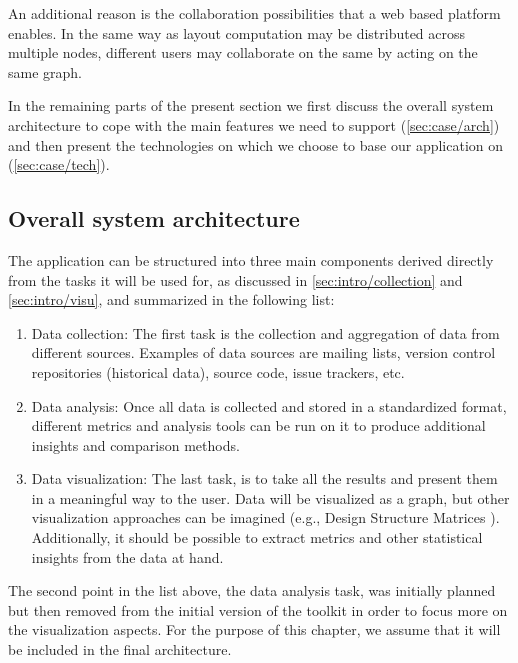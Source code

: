 An additional reason is the collaboration possibilities that a web based platform enables. In the same way as layout computation may be distributed across multiple nodes, different users may collaborate on the same by acting on the same graph.

In the remaining parts of the present section we first discuss the overall system architecture to cope with the main features we need to support (\vref*{sec:case/arch}) and then present the technologies on which we choose to base our application on (\vref*{sec:case/tech}).

\subsection{Overall system architecture}
\label{sec:case/arch}

The application can be structured into three main components derived directly from the tasks it will be used for, as discussed in \ref{sec:intro/collection} and \vref{sec:intro/visu}, and summarized in the following list:

\begin{enumerate}[itemsep=-2pt]
    \item Data collection: The first task is the collection and aggregation of data from different sources. Examples of data sources are mailing lists, version control repositories (historical data), source code, issue trackers, etc.
    \item Data analysis: Once all data is collected and stored in a standardized format, different metrics and analysis tools can be run on it to produce additional insights and comparison methods.
    \item Data visualization: The last task, is to take all the results and present them in a meaningful way to the user. Data will be visualized as a graph, but other visualization approaches can be imagined (e.g., Design Structure Matrices \cite{dsm}). Additionally, it should be possible to extract metrics and other statistical insights from the data at hand.
\end{enumerate}

\begin{noteframe}[frametitle={Note}]
The second point in the list above, the data analysis task, was initially planned but then removed from the initial version of the toolkit in order to focus more on the visualization aspects. For the purpose of this chapter, we assume that it will be included in the final architecture.
\end{noteframe}
  
